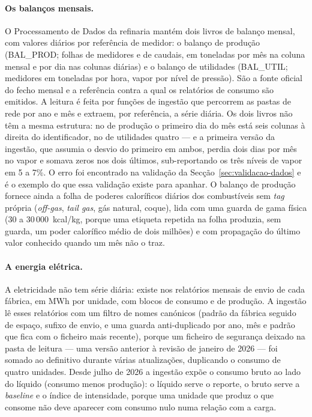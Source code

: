 \paragraph{Os balanços mensais.} O Processamento de Dados da refinaria
mantém dois livros de balanço mensal, com valores diários por referência
de medidor: o balanço de produção (BAL\_PROD; folhas de medidores e de
caudais, em toneladas por mês na coluna mensal e por dia nas colunas
diárias) e o balanço de utilidades (BAL\_UTIL; medidores em toneladas por
hora, vapor por nível de pressão). São a fonte oficial do fecho mensal e a
referência contra a qual os relatórios de consumo são emitidos. A leitura
é feita por funções de ingestão que percorrem as pastas de rede por ano e
mês e extraem, por referência, a série diária. Os dois livros não têm a
mesma estrutura: no de produção o primeiro dia do mês está seis colunas à
direita do identificador, no de utilidades quatro --- e a primeira versão
da ingestão, que assumia o desvio do primeiro em ambos, perdia dois dias
por mês no vapor e somava zeros nos dois últimos, sub-reportando os três
níveis de vapor em 5 a 7\%. O erro foi encontrado na validação da
Secção~\ref{sec:validacao-dados} e é o exemplo do que essa validação existe
para apanhar. O balanço de produção fornece ainda a folha de poderes
caloríficos diários dos combustíveis sem \emph{tag} própria (\emph{off-gas},
\emph{tail gas}, gás natural, coque), lida com uma guarda de gama física
(30 a 30\,000~kcal/kg, porque uma etiqueta repetida na folha produzia, sem
guarda, um poder calorífico médio de dois milhões) e com propagação do
último valor conhecido quando um mês não o traz.

\paragraph{A energia elétrica.} A eletricidade não tem série diária: existe
nos relatórios mensais de envio de cada fábrica, em MWh por unidade, com
blocos de consumo e de produção. A ingestão lê esses relatórios com um
filtro de nomes canónicos (padrão da fábrica seguido de espaço, sufixo de
envio, e uma guarda anti-duplicado por ano, mês e padrão que fica com o
ficheiro mais recente), porque um ficheiro de segurança deixado na pasta
de leitura --- uma versão anterior à revisão de janeiro de 2026 --- foi
somado ao definitivo durante várias atualizações, duplicando o consumo de
quatro unidades. Desde julho de 2026 a ingestão expõe o consumo bruto ao
lado do líquido (consumo menos produção): o líquido serve o reporte, o
bruto serve a \emph{baseline} e o índice de intensidade, porque uma unidade
que produz o que consome não deve aparecer com consumo nulo numa relação
com a carga.

